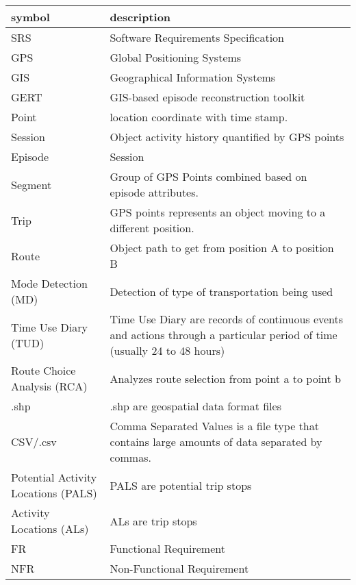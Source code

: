 \documentclass[12pt, titlepage]{article}
\begin{document}
\renewcommand{\arraystretch}{1.2}
\begin{tabular}{l p{10cm}} 
  \toprule		
  \textbf{symbol} & \textbf{description}\\
  \midrule 
  SRS & Software Requirements Specification \\
  GPS & Global Positioning Systems\\
  GIS & Geographical Information Systems\\
  GERT & GIS-based episode reconstruction toolkit \\
  Point & location coordinate with time stamp.\\
  Session & Object activity history quantified by GPS points \\
  Episode & Session\\
  Segment & Group of GPS Points combined based on episode attributes.\\
  Trip & GPS points represents an object moving to a different position.\\
  Route & Object path to get from position A to position B\\
  Mode Detection (MD) & Detection of type of transportation being used \\
  Time Use Diary (TUD) & Time Use Diary are records of continuous events and actions through a particular period of time (usually 24 to 48 hours) \\
  Route Choice Analysis (RCA) &  Analyzes route selection from point a to point b\\
  .shp & .shp are geospatial data format files\\
  CSV/.csv & Comma Separated Values is a file type that contains large amounts of data separated by commas. \\
  Potential Activity Locations (PALS) & PALS are potential trip stops \\
  Activity Locations (ALs) & ALs are trip stops \\
  FR & Functional Requirement \\
  NFR & Non-Functional Requirement \\


  \bottomrule
\end{tabular}\\



\newpage
\end{document}
